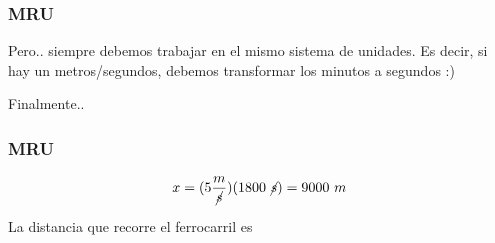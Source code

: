 \documentclass{beamer}
\begin{document}
\begin{frame}
\frametitle{MRU}
{\huge \xmru}

Pero.. siempre debemos trabajar en el mismo sistema de unidades.
Es decir, si hay un metros/segundos,
debemos transformar los 
minutos a segundos :)

\begin{center}
\end{center}

Finalmente..
\end{frame}

\begin{frame}
\frametitle{MRU}
{\large
\begin{equation}
x=
(5\frac{m}{\cancel{s}})
(1800~\cancel{s})=
9000~m
\end{equation}}

La distancia que recorre el ferrocarril es
\end{frame}
\end{document}
